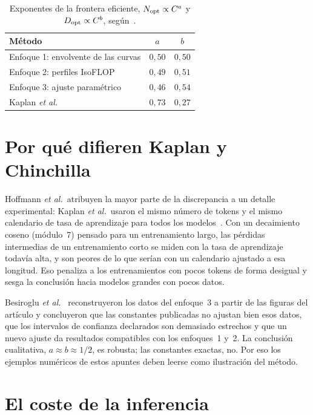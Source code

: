 \begin{table}[h]
\centering\small
\caption{Exponentes de la frontera eficiente, $N_{\mathrm{opt}}\propto C^{a}$ y $D_{\mathrm{opt}}\propto C^{b}$, según~\cite[tabla~2]{hoffmann}.}\label{tab:exponentes}
\begin{tabular}{@{}lcc@{}}
\toprule
Método & $a$ & $b$ \\
\midrule
Enfoque 1: envolvente de las curvas & $0{,}50$ & $0{,}50$ \\
Enfoque 2: perfiles IsoFLOP & $0{,}49$ & $0{,}51$ \\
Enfoque 3: ajuste paramétrico & $0{,}46$ & $0{,}54$ \\
Kaplan \emph{et al.}~\cite{kaplan} & $0{,}73$ & $0{,}27$ \\
\bottomrule
\end{tabular}
\end{table}

\section{Por qué difieren Kaplan y Chinchilla}

Hoffmann \emph{et al.}\ atribuyen la mayor parte de la discrepancia a un detalle experimental: Kaplan \emph{et al.}\ usaron el mismo número de tokens y el mismo calendario de tasa de aprendizaje para todos los modelos~\cite[§2 y apéndice~B]{hoffmann}. Con un decaimiento coseno (módulo~7) pensado para un entrenamiento largo, las pérdidas intermedias de un entrenamiento corto se miden con la tasa de aprendizaje todavía alta, y son peores de lo que serían con un calendario ajustado a esa longitud. Eso penaliza a los entrenamientos con pocos tokens de forma desigual y sesga la conclusión hacia modelos grandes con pocos datos.

\begin{observacion}
Besiroglu \emph{et al.}~\cite{besiroglu} reconstruyeron los datos del enfoque~3 a partir de las figuras del artículo y concluyeron que las constantes publicadas no ajustan bien esos datos, que los intervalos de confianza declarados son demasiado estrechos y que un nuevo ajuste da resultados compatibles con los enfoques~1 y~2. La conclusión cualitativa, $a\approx b\approx 1/2$, es robusta; las constantes exactas, no. Por eso los ejemplos numéricos de estos apuntes deben leerse como ilustración del método.
\end{observacion}

\section{El coste de la inferencia}

